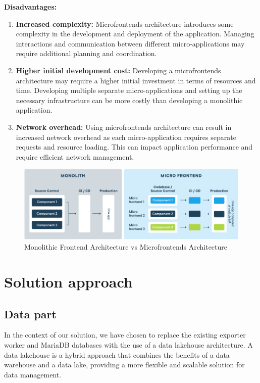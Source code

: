 \textbf{Disadvantages:}
\begin{enumerate}
\item \textbf{Increased complexity:} Microfrontends architecture introduces some complexity in the development and deployment of the application. Managing interactions and communication between different micro-applications may require additional planning and coordination.
\item \textbf{Higher initial development cost:} Developing a microfrontends architecture may require a higher initial investment in terms of resources and time. Developing multiple separate micro-applications and setting up the necessary infrastructure can be more costly than developing a monolithic application.
\item \textbf{Network overhead:} Using microfrontends architecture can result in increased network overhead as each micro-application requires separate requests and resource loading. This can impact application performance and require efficient network management.
\end{enumerate}

\begin{figure}[H]
\centering
\includegraphics[width=\linewidth]{images/micro-frontend-vs-monolith-frontend.png}
\caption{Monolithic Frontend Architecture vs Microfrontends Architecture}\label{fig:monolithfrontendvsmicrofrontends}
\end{figure}

\section{Solution approach}
\subsection{Data part}
In the context of our solution, we have chosen to replace the existing exporter worker and MariaDB databases with the use of a data lakehouse architecture. A data lakehouse is a hybrid approach that combines the benefits of a data warehouse and a data lake, providing a more flexible and scalable solution for data management.


